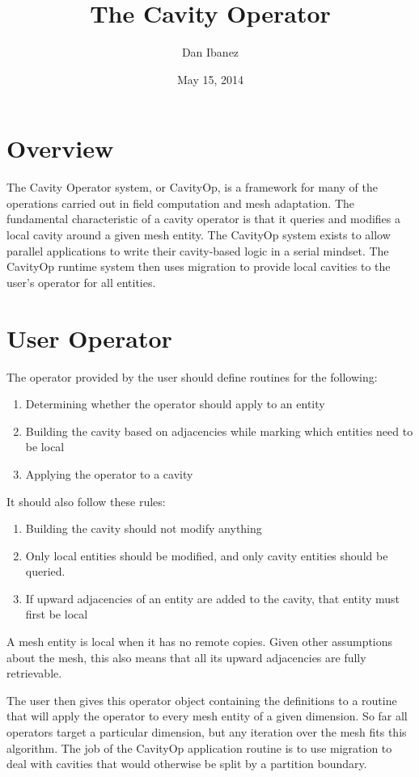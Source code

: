 \documentclass{article}
\title{The Cavity Operator}
\author{Dan Ibanez}
\begin{document}
\date{May 15, 2014}
\maketitle

\section{Overview}

The Cavity Operator system, or CavityOp, is a framework
for many of the operations carried out in field computation
and mesh adaptation.
The fundamental characteristic of a cavity operator is that
it queries and modifies a local cavity around a given mesh
entity.
The CavityOp system exists to allow parallel applications to
write their cavity-based logic in a serial mindset.
The CavityOp runtime system then uses migration to provide
local cavities to the user's operator for all entities.

\section{User Operator}

The operator provided by the user should define routines for
the following:
\begin{enumerate}
\item Determining whether the operator should apply to an entity
\item Building the cavity based on adjacencies while
marking which entities need to be local
\item Applying the operator to a cavity
\end{enumerate}
It should also follow these rules:
\begin{enumerate}
\item Building the cavity should not modify anything
\item Only local entities should be modified, and only cavity
entities should be queried.
\item If upward adjacencies of an entity are added to the cavity,
that entity must first be local
\end{enumerate}
A mesh entity is local when it has no remote copies.
Given other assumptions about the mesh, this also means
that all its upward adjacencies are fully retrievable.

The user then gives this operator object containing the definitions
to a routine that will apply the operator to every mesh
entity of a given dimension.
So far all operators target a particular dimension, but any
iteration over the mesh fits this algorithm.
The job of the CavityOp application routine is to use migration
to deal with cavities that would otherwise be split by a
partition boundary.
\end{document}
